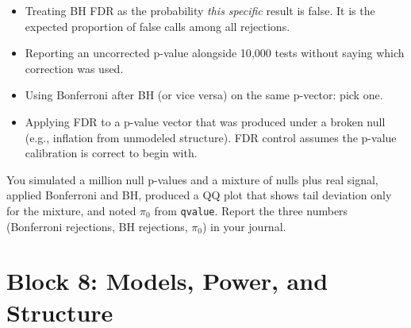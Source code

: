 \begin{warnbox}
\begin{itemize}[nosep]
  \item Treating BH FDR as the probability \textit{this specific} result is false. It is the expected proportion of false calls among all rejections.
  \item Reporting an uncorrected p-value alongside 10{,}000 tests without saying which correction was used.
  \item Using Bonferroni after BH (or vice versa) on the same p-vector: pick one.
  \item Applying FDR to a p-value vector that was produced under a broken null (e.g., inflation from unmodeled structure). FDR control assumes the p-value calibration is correct to begin with.
\end{itemize}
\end{warnbox}
\begin{winbox}[Checkpoint]
You simulated a million null p-values and a mixture of nulls plus real signal, applied Bonferroni and BH, produced a QQ plot that shows tail deviation only for the mixture, and noted $\pi_0$ from \texttt{qvalue}. Report the three numbers (Bonferroni rejections, BH rejections, $\pi_0$) in your journal.
\end{winbox}


\section{Block 8: Models, Power, and Structure}

